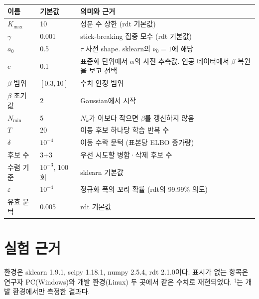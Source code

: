 \documentclass[11pt]{article}
\begin{document}
\begin{center}
\small
\begin{tabular}{p{3.4cm}p{1.7cm}p{8.4cm}}
\toprule
이름 & 기본값 & 의미와 근거 \\
\midrule
$K_{\max}$ & 10 & 성분 수 상한 (rdt 기본값) \\
$\gamma$ & 0.001 & stick-breaking 집중 모수 (rdt 기본값) \\
$a_0$ & 0.5 & $\tau$ 사전 shape. sklearn의 $\nu_0=1$에 해당 \\
$c$ & 0.1 & 표준화 단위에서 $\alpha$의 사전 추측값. 인공 데이터에서 $\beta$ 복원을 보고 선택 \\
$\beta$ 범위 & $[0.3,10]$ & 수치 안정 범위 \\
$\beta$ 초기값 & 2 & Gaussian에서 시작 \\
$N_{\min}$ & 5 & $N_k$가 이보다 작으면 $\beta$를 갱신하지 않음 \\
$T$ & 20 & 이동 후보 하나당 학습 반복 수 \\
$\delta$ & $10^{-4}$ & 이동 수락 문턱 (표본당 ELBO 증가량) \\
후보 수 & 3+3 & 우선 시도할 병합·삭제 후보 수 \\
수렴 기준 & $10^{-3}$, 100회 & sklearn 기본값 \\
$\varepsilon$ & $10^{-4}$ & 정규화 폭의 꼬리 확률 (rdt의 99.99\% 의도) \\
유효 문턱 & 0.005 & rdt 기본값 \\
\bottomrule
\end{tabular}
\end{center}

\section{실험 근거}\label{sec:evidence}

환경은 sklearn 1.9.1, scipy 1.18.1, numpy 2.5.4, rdt 2.1.0이다. 표시가 없는 항목은 연구자 PC(Windows)와 개발 환경(Linux) 두 곳에서 같은 수치로 재현되었다. $^\dagger$는 개발 환경에서만 측정한 결과다.
\end{document}
